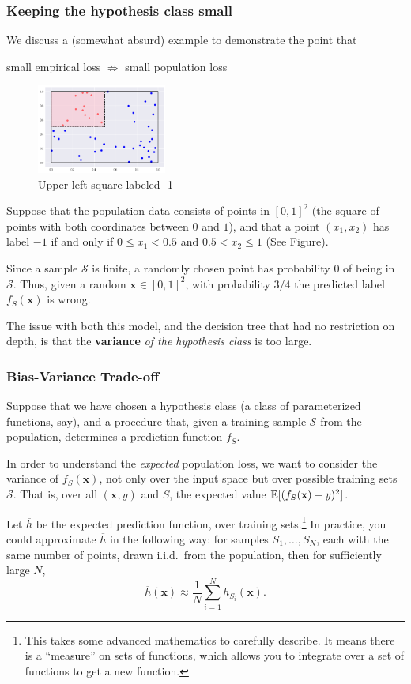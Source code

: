 \documentclass[smaller]{beamer}
\theoremstyle{example}
\newcommand{\x}{\textbf{x}}
\newcommand{\ix}[1]{{\it #1}}
\begin{document}
\begin{frame}
    \frametitle{Keeping the hypothesis class small}
We discuss a (somewhat absurd) example to demonstrate the point that 
\begin{center} small empirical loss $\not\Rightarrow$ small population loss\end{center}

\begin{figure}
    \begin{center}
        \includegraphics[width=0.38\textwidth]{../../Images/fourth_square-13v37.png}
    \end{center}
    \caption{Upper-left square labeled -1}
\end{figure}

Suppose that the population data consists of points in $[0,1]^2$ (the square of points with both coordinates between $0$ and $1$), and that a point $(x_1,x_2)$ has label $-1$ if and only if $0\le x_1 < 0.5$ and $0.5< x_2 \le 1$ (See Figure).
\vspace*{12pt}

Since a sample $\mathcal S$ is finite, a randomly chosen point has probability $0$ of being in $\mathcal S$. Thus, given a random $\x\in[0,1]^2$, with probability $3/4$ the predicted label $f_S(\x)$ is wrong.

The issue with both this model, and the decision tree that had no restriction on depth, is that the \textbf{variance} \textit{of the hypothesis class} is too large.
\end{frame}

\begin{frame}
    \frametitle{Bias-Variance Trade-off}
    Suppose that we have chosen a hypothesis class (a class of parameterized functions, say), and a procedure that, given a training sample $\mathcal S$ from the population, determines a prediction function $f_S$.

    In order to understand the \textit{expected} population loss, we want to consider the variance of $f_S(\x)$, not only over the input space but over possible training sets $\mathcal S$. That is, over all $(\x, y)$ and $S$, the expected value $\mathbb E[(f_S(\x) - \ix y)^2]$.

    Let $\overline{h}$ be the expected prediction function, over training sets.\footnote{This takes some advanced mathematics to carefully describe. It means there is a ``measure'' on sets of functions, which allows you to integrate over a set of functions to get a new function.} In practice, you could approximate $\overline{h}$ in the following way: for samples $S_1,\ldots,S_N$, each with the same number of points, drawn i.i.d.\ from the population, then for sufficiently large $N$, 
        \[\overline{h}(\x) \approx \frac{1}{N}\sum_{i=1}^Nh_{S_i}(\x).\]
\end{frame}
\end{document}
